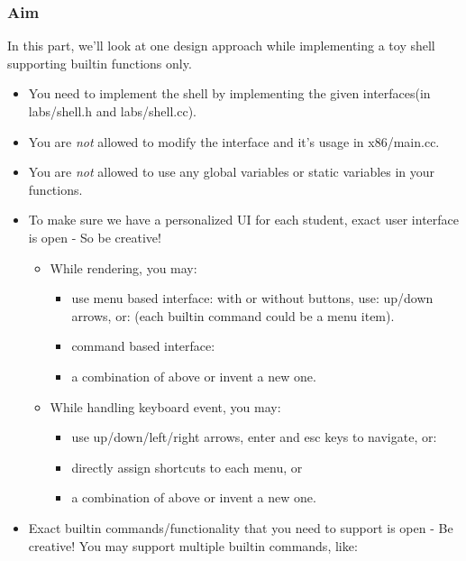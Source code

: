 \documentclass[]{book}
\newenvironment{Shaded}{}{}
\newcommand{\KeywordTok}[1]{\textbf{{#1}}}
\newcommand{\NormalTok}[1]{{#1}}
\begin{document}
\begin{Shaded}
\end{Shaded}

\subsubsection*{Aim}\label{aim-3}

In this part, we'll look at one design approach while implementing a toy
shell supporting builtin functions only.

\begin{itemize}
\itemsep1pt\parskip0pt
\item
  You need to implement the shell by implementing the given
  interfaces(in labs/shell.h and labs/shell.cc).
\item
  You are \emph{not} allowed to modify the interface and it's usage in
  x86/main.cc.
\item
  You are \emph{not} allowed to use any global variables or static
  variables in your functions.
\item
  To make sure we have a personalized UI for each student, exact user
  interface is open - So be creative!

  \begin{itemize}
  \itemsep1pt\parskip0pt
  \item
    While rendering, you may:

    \begin{itemize}
    \itemsep1pt\parskip0pt
    \item
      use menu based interface: with or without buttons, use: up/down
      arrows, or: (each builtin command could be a menu item).
    \item
      command based interface:
    \item
      a combination of above or invent a new one.
    \end{itemize}
  \item
    While handling keyboard event, you may:

    \begin{itemize}
    \itemsep1pt\parskip0pt
    \item
      use up/down/left/right arrows, enter and esc keys to navigate, or:
    \item
      directly assign shortcuts to each menu, or
    \item
      a combination of above or invent a new one.
    \end{itemize}
  \end{itemize}
\item
  Exact builtin commands/functionality that you need to support is open
  - Be creative! You may support multiple builtin commands, like:


\end{itemize}
\end{document}
